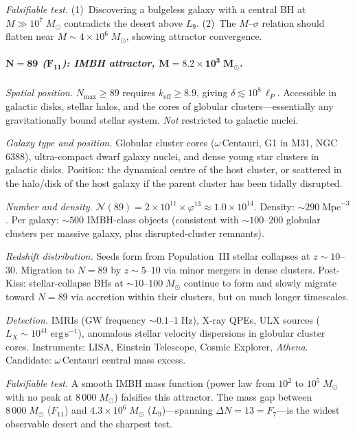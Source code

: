\documentclass[12pt,a4paper]{article}
\begin{document}
\textit{Falsifiable test.}\; (1)~Discovering a bulgeless galaxy with a central BH at $M \gg 10^7\;M_\odot$ contradicts the desert above $L_9$.  (2)~The $M$--$\sigma$ relation should flatten near $M \sim 4 \times 10^6\;M_\odot$, showing attractor convergence.

\subparagraph{$\boldsymbol{N = 89}$ ($\boldsymbol{F_{11}}$): IMBH attractor, $\boldsymbol{M = 8.2 \times 10^{3}\;M_\odot}$.}

\textit{Spatial position.}\; $N_{\max} \geq 89$ requires $k_{\mathrm{eff}} \geq 8.9$, giving $\delta \lesssim 10^8\,\ell_P$.  Accessible in galactic disks, stellar halos, and the cores of globular clusters---essentially any gravitationally bound stellar system.  \emph{Not} restricted to galactic nuclei.

\textit{Galaxy type and position.}\; Globular cluster cores ($\omega$\,Centauri, G1 in M31, NGC\,6388), ultra-compact dwarf galaxy nuclei, and dense young star clusters in galactic disks.  Position: the dynamical centre of the host cluster, or scattered in the halo/disk of the host galaxy if the parent cluster has been tidally disrupted.

\textit{Number and density.}\; $\mathcal{N}(89) = 2 \times 10^{11} \times \varphi^{13} \approx 1.0 \times 10^{14}$.  Density: $\sim 290\;\mathrm{Mpc}^{-3}$.  Per galaxy: $\sim 500$ IMBH-class objects (consistent with $\sim 100$--$200$ globular clusters per massive galaxy, plus disrupted-cluster remnants).

\textit{Redshift distribution.}\; Seeds form from Population~III stellar collapses at $z \sim 10$--$30$.  Migration to $N = 89$ by $z \sim 5$--$10$ via minor mergers in dense clusters.  Post-Kiss: stellar-collapse BHs at $\sim 10$--$100\;M_\odot$ continue to form and slowly migrate toward $N = 89$ via accretion within their clusters, but on much longer timescales.

\textit{Detection.}\; IMRIs (GW frequency $\sim 0.1$--$1\;\mathrm{Hz}$), X-ray QPEs, ULX sources ($L_X \sim 10^{41}\;\mathrm{erg\,s}^{-1}$), anomalous stellar velocity dispersions in globular cluster cores.  Instruments: LISA, Einstein Telescope, Cosmic Explorer, \emph{Athena}.  Candidate: $\omega$\,Centauri central mass excess.

\textit{Falsifiable test.}\; A smooth IMBH mass function (power law from $10^2$ to $10^5\;M_\odot$ with no peak at $8\,000\;M_\odot$) falsifies this attractor.  The mass gap between $8\,000\;M_\odot$ ($F_{11}$) and $4.3 \times 10^6\;M_\odot$ ($L_9$)---spanning $\Delta N = 13 = F_7$---is the widest observable desert and the sharpest test.
\end{document}
